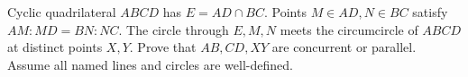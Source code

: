 Cyclic quadrilateral $ABCD$ has $E=AD\cap BC$. Points $M\in AD,N\in BC$ satisfy $AM:MD=BN:NC$. The circle through $E,M,N$ meets the circumcircle of $ABCD$ at distinct points $X,Y$. Prove that $AB,CD,XY$ are concurrent or parallel. Assume all named lines and circles are well-defined.
